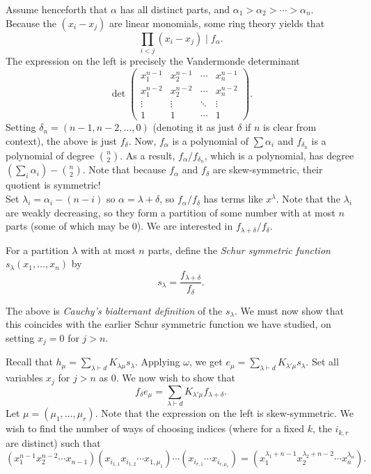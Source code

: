 	Assume henceforth that $\alpha$ has all distinct parts, and $\alpha_1 > \alpha_2 > \cdots > \alpha_n$.\\
	Because the $(x_i - x_j)$ are linear monomials, some ring theory yields that
	\[ \prod_{i < j} (x_i - x_j) \mid f_\alpha. \]
	The expression on the left is precisely the Vandermonde determinant
	\[ \det \begin{pmatrix} x_1^{n-1} & x_2^{n-1} & \cdots & x_n^{n-1} \\ x_1^{n-2} & x_2^{n-2} & \cdots & x_n^{n-2} \\ \vdots & \vdots & \ddots & \vdots \\ 1 & 1 & \cdots & 1 \end{pmatrix}. \]
	Setting $\delta_n = (n-1,n-2,\ldots,0)$ (denoting it as just $\delta$ if $n$ is clear from context), the above is just $f_{\delta}$. Now, $f_\alpha$ is a polynomial of $\sum \alpha_i$ and $f_{\delta_n}$ is a polynomial of degree $\binom{n}{2}$. As a result, $f_\alpha/f_{\delta_n}$, which is a polynomial, has degree $\left(\sum_i \alpha_i\right) - \binom{n}{2}$. Note that because $f_\alpha$ and $f_\delta$ are skew-symmetric, their quotient is symmetric!\\
	Set $\lambda_i = \alpha_i - (n-i)$ so $\alpha = \lambda + \delta$, so $f_\alpha/f_\delta$ has terms like $x^\lambda$. Note that the $\lambda_i$ are weakly decreasing, so they form a partition of some number with at most $n$ parts (some of which may be $0$). We are interested in $f_{\lambda+\delta}/f_\delta$.

	\begin{fdef}
		For a partition $\lambda$ with at most $n$ parts, define the \emph{Schur symmetric function} $s_\lambda(x_1,\ldots,x_n)$ by
		\[ s_\lambda = \frac{f_{\lambda+\delta}}{f_\delta}. \]
	\end{fdef}
	The above is \emph{Cauchy's bialternant definition} of the $s_\lambda$. We must now show that this coincides with the earlier Schur symmetric function we have studied, on setting $x_j = 0$ for $j > n$.

	Recall that $h_\mu = \sum_{\lambda \vdash d} K_{\lambda\mu} s_\lambda$. Applying $\omega$, we get $e_\mu = \sum_{\lambda \vdash d} K_{\lambda'\mu} s_\lambda$. Set all variables $x_j$ for $j > n$ as $0$. We now wish to show that
	\[ f_\delta e_\mu = \sum_{\lambda \vdash d} K_{\lambda'\mu} f_{\lambda+\delta}. \]
	Let $\mu = (\mu_1,\ldots,\mu_r)$. Note that the expression on the left is skew-symmetric. We wish to find the number of ways of choosing indices (where for a fixed $k$, the $i_{k,r}$ are distinct) such that
	\[ (x_1^{n-1} x_2^{n-2} \cdots x_{n-1})(x_{i_{1,1}}x_{i_{1,2}}\cdots x_{1,\mu_1})\cdots(x_{i_{r,1}}\cdots x_{i_{r,\mu_r}}) = ( x_1^{\lambda_1 + n-1} x_2^{\lambda_2 + n-2} \cdots x_n^{\lambda_n} ). \]

